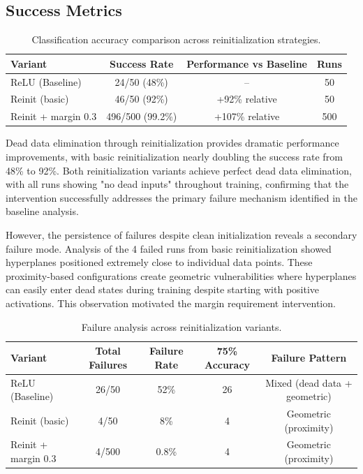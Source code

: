 
\subsection*{Success Metrics}

\begin{table}[ht]
\centering
\caption{Classification accuracy comparison across reinitialization strategies.}
\label{tab:relu1-reinit-success}
\begin{tabular}{lccc}
\toprule
Variant & Success Rate & Performance vs Baseline & Runs \\
\midrule
ReLU (Baseline) & 24/50 (48\%) & -- & 50 \\
Reinit (basic) & 46/50 (92\%) & +92\% relative & 50 \\
Reinit + margin 0.3 & 496/500 (99.2\%) & +107\% relative & 500 \\
\bottomrule
\end{tabular}
\end{table}

Dead data elimination through reinitialization provides dramatic performance improvements, with basic reinitialization nearly doubling the success rate from 48\% to 92\%. Both reinitialization variants achieve perfect dead data elimination, with all runs showing "no dead inputs" throughout training, confirming that the intervention successfully addresses the primary failure mechanism identified in the baseline analysis.

However, the persistence of failures despite clean initialization reveals a secondary failure mode. Analysis of the 4 failed runs from basic reinitialization showed hyperplanes positioned extremely close to individual data points. These proximity-based configurations create geometric vulnerabilities where hyperplanes can easily enter dead states during training despite starting with positive activations. This observation motivated the margin requirement intervention.

\begin{table}[ht]
\centering
\caption{Failure analysis across reinitialization variants.}
\label{tab:relu1-reinit-failures}
\begin{tabular}{lcccc}
\toprule
Variant & Total Failures & Failure Rate & 75\% Accuracy & Failure Pattern \\
\midrule
ReLU (Baseline) & 26/50 & 52\% & 26 & Mixed (dead data + geometric) \\
Reinit (basic) & 4/50 & 8\% & 4 & Geometric (proximity) \\
Reinit + margin 0.3 & 4/500 & 0.8\% & 4 & Geometric (proximity) \\
\bottomrule
\end{tabular}
\end{table}

